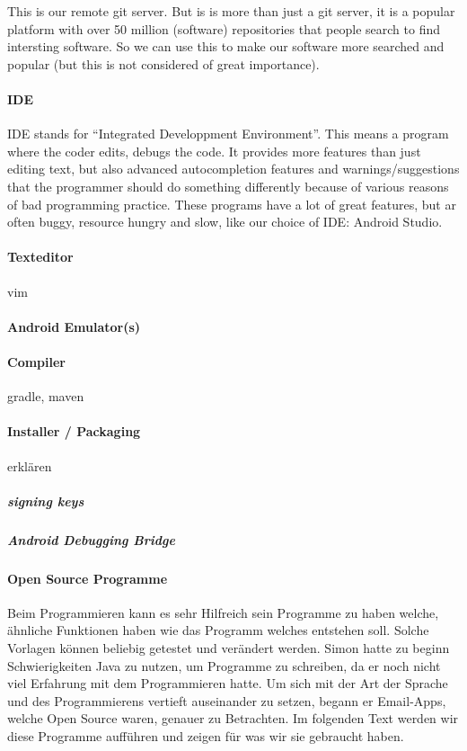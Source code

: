\documentclass[a4paper,11pt]{article}
\begin{document}
This is our remote git server. But is is more than just a git server, it is a popular platform with over 50 million (software) repositories that people search to find intersting software. So we can use this to make our software more searched and popular (but this is not considered of great importance).

\paragraph{IDE}
IDE stands for ``Integrated Developpment Environment''. This means a program where the coder edits, debugs the code. It provides more features than just editing text, but also advanced autocompletion features and warnings/suggestions that the programmer should do something differently because of various reasons of bad programming practice. These programs have a lot of great features, but ar often buggy, resource hungry and slow, like our choice of IDE: Android Studio.
\paragraph{Texteditor}
vim

\paragraph{Android Emulator(s)}

\paragraph{Compiler}
gradle, maven

\paragraph{Installer / Packaging}
erklären

\subparagraph{signing keys}
\subparagraph{Android Debugging Bridge}


\paragraph{Open Source Programme}

Beim Programmieren kann es sehr Hilfreich sein Programme zu haben welche, ähnliche Funktionen haben wie das Programm welches entstehen soll. 
Solche Vorlagen können beliebig getestet und verändert werden. Simon hatte zu beginn Schwierigkeiten Java zu nutzen, um Programme zu schreiben, da er noch nicht viel 
Erfahrung mit dem Programmieren hatte. Um sich mit der Art der Sprache und des Programmierens vertieft auseinander zu setzen, begann er Email-Apps, welche Open Source
waren, genauer zu Betrachten. Im folgenden Text werden wir diese Programme aufführen und zeigen für was wir sie gebraucht haben. 
\end{document}
